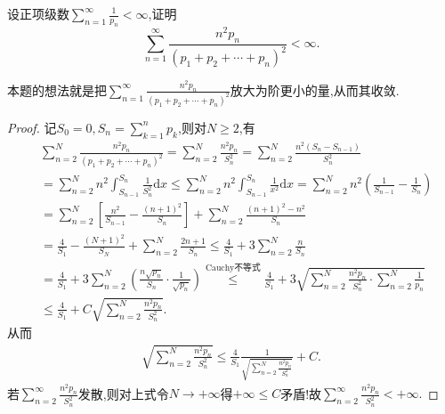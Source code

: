 \documentclass[../../main.tex]{subfiles}%
\begin{document}
\begin{example}
设正项级数$\sum\limits_{n=1}^\infty \frac{1}{p_n}<\infty$,证明
$$\sum_{n=1}^\infty \frac{n^2 p_n}{(p_1+p_2+\cdots +p_n)^2}<\infty.$$
\end{example}
\begin{remark}
本题的想法就是把$\sum\limits_{n=1}^\infty \frac{n^2 p_n}{(p_1+p_2+\cdots +p_n)^2}$放大为阶更小的量,从而其收敛.
\end{remark}
\begin{proof}

记$S_0=0,S_n=\sum_{k=1}^n{p_k}$,则对$N\geqslant 2$,有
\begin{align*}
&\sum_{n=2}^N{\frac{n^2p_n}{(p_1+p_2+\cdots +p_n)^2}}=\sum_{n=2}^N{\frac{n^2p_n}{S_{n}^{2}}}=\sum_{n=2}^N{\frac{n^2\left( S_n-S_{n-1} \right)}{S_{n}^{2}}} \\
&=\sum_{n=2}^N{n^2\int_{S_{n-1}}^{S_n}{\frac{1}{S_{n}^{2}}\mathrm{d}x}}\leqslant \sum_{n=2}^N{n^2\int_{S_{n-1}}^{S_n}{\frac{1}{x^2}\mathrm{d}x}}=\sum_{n=2}^N{n^2\left( \frac{1}{S_{n-1}}-\frac{1}{S_n} \right)} \\
&=\sum_{n=2}^N{\left[ \frac{n^2}{S_{n-1}}-\frac{\left( n+1 \right) ^2}{S_n} \right]}+\sum_{n=2}^N{\frac{\left( n+1 \right) ^2-n^2}{S_n}} \\
&=\frac{4}{S_1}-\frac{\left( N+1 \right) ^2}{S_N}+\sum_{n=2}^N{\frac{2n+1}{S_n}} 
\leqslant \frac{4}{S_1}+3\sum_{n=2}^N{\frac{n}{S_n}}\\
&=\frac{4}{S_1}+3\sum_{n=2}^N{\left( \frac{n\sqrt{p_n}}{S_n}\cdot \frac{1}{\sqrt{p_n}} \right)} \overset{\text{Cauchy不等式}}{\leqslant}\frac{4}{S_1}+3\sqrt{\sum_{n=2}^N{\frac{n^2p_n}{S_{n}^{2}}}\cdot \sum_{n=2}^N{\frac{1}{p_n}}} \\
&\leqslant \frac{4}{S_1}+C\sqrt{\sum_{n=2}^N{\frac{n^2p_n}{S_{n}^{2}}}}.
\end{align*}
从而
\begin{align*}
\sqrt{\sum_{n=2}^N{\frac{n^2p_n}{S_{n}^{2}}}}\leqslant \frac{4}{S_1}\frac{1}{\sqrt{\sum\limits_{n=2}^N{\frac{n^2p_n}{S_{n}^{2}}}}}+C.
\end{align*}
若$\sum_{n=2}^{\infty}{\frac{n^2p_n}{S_{n}^{2}}}$发散,则对上式令$N\rightarrow +\infty$得$+\infty \leqslant C$矛盾!故$\sum_{n=2}^{\infty}{\frac{n^2p_n}{S_{n}^{2}}}<+\infty .$

\end{proof}
\end{document}

